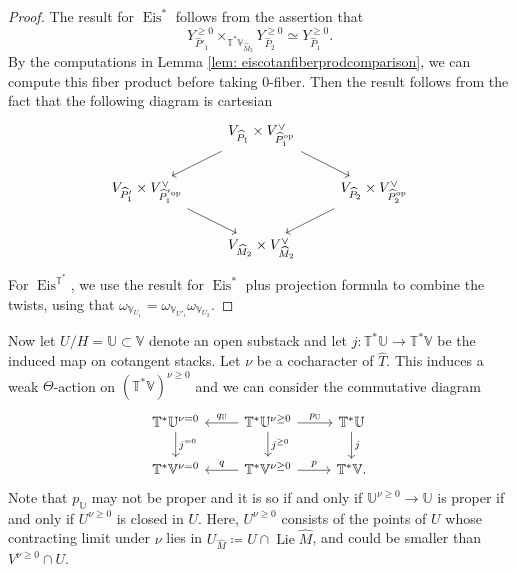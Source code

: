 \documentclass{amsart}
\theoremstyle{definition}
\theoremstyle{remark}
\numberwithin{equation}{section}
\DeclareMathOperator{\Lie}{Lie}
\newcommand{\U}{\mathbb{U}}
\newcommand{\op}{\mathrm{op}}
\newcommand{\wh}{\widehat}
\DeclareMathOperator{\Eis}{\mathrm{Eis}}
\newcommand{\V}{\mathbb{V}}
\newcommand{\T}{\mathbb{T}}
\begin{document}
\begin{proof}
    The result for $\Eis^{\ast}$ follows from the assertion that
    \begin{equation*}
        Y^{\geq 0}_{\wh{P}'_1} \times_{\T^{\ast}\V_{\wh{M}_2}} Y^{\geq 0}_{\wh{P}_2} \simeq Y^{\geq 0}_{\wh{P}_1}.
    \end{equation*}
    By the computations in Lemma \ref{lem: eiscotanfiberprodcomparison}, we can compute this fiber product before taking $0$-fiber. Then the result follows from the fact that the following diagram is cartesian
    \begin{equation*}
        \begin{tikzcd}
            & V_{\wh{P}_1} \times V^{\vee}_{\wh{P}^{\op}_1} \arrow[dl] \arrow[dr] & \\
         V_{\wh{P}'_1} \times V^{\vee}_{\wh{P}^{' \op}_1}  \arrow[dr] & &  V_{\wh{P}_2} \times V^{\vee}_{\wh{P}^{\op}_2} \arrow[dl] \\
            & V_{\wh{M}_2} \times V^{\vee}_{\wh{M}_2} & 
        \end{tikzcd}
    \end{equation*}
For $\Eis^{\T^{\ast}}$, we use the result for $\Eis^{\ast}$ plus projection formula to combine the twists, using that $\omega_{\V_{U_1}} = \omega_{\V_{U'_1}}\omega_{\V_{U_2}}$.
\end{proof}







Now let $U/H = \U \subset \V$ denote an open substack and let $j: \T^{\ast}\U \rightarrow \T^{\ast}\V$ be the induced map on cotangent stacks. Let $\nu$ be a cocharacter of $\wh T$. This induces a weak $\Theta$-action on $(\T^{\ast}\V)^{\nu \geq 0}$ and we can consider the commutative diagram 
\begin{equation}{\label{eqn: naturalitydiagram}}
    \begin{tikzcd}
\T^{\ast}\U^{\nu = 0} \arrow[d, "j^{=0}"] & \T^{\ast}\U^{\nu \geq 0} \arrow[r, "p_\U"] \arrow[d, "j^{\geq 0}"] \arrow[l, swap, "q_\U"]&  \T^{\ast}\U \arrow[d, "j"] \\
 \T^{\ast}\V^{\nu = 0} & \T^{\ast}\V^{\nu\geq 0} \arrow[r, "p"] \arrow[l, swap, "q"] & \T^{\ast}\V .
    \end{tikzcd}
\end{equation}
Note that $p_\U$ may not be proper and it is so if and only if $\U^{\nu\geq 0}\to \U$ is proper if and only if $U^{\nu\geq 0}$ is closed in $U$. Here, $U^{\nu \geq 0}$ consists of the points of $U$ whose contracting limit under $\nu$ lies in $U_{\wh{M}} \coloneq U \cap \Lie \wh{M}$, and could be smaller than $V^{\nu\geq 0}\cap U$. 
\end{document}
